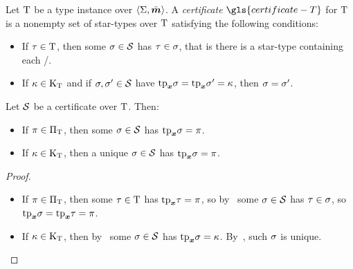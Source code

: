 \begin{definition}
Let $\mathrm{T}$ be a type instance over $\left\langle \mathrm{\Sigma},\bar{\bm{m}} \right\rangle$.
A \emph{certificate} $\gls{certificate-T}$ for $\mathrm{T}$ is a nonempty set of
star-types over $\mathrm{T}$ satisfying the following conditions:
\begin{itemize}
  \item[\condcertT]\label{cond:certT}
  If $\tau\in\mathrm{T}$, then some $\sigma\in\mathcal{S}$ has $\tau\in\sigma$,
  that is there is a star-type containing each \twotype/.
  \item[\condcertk]\label{cond:certk}
  If $\kappa\in{\mathrm{K}}_{\mathrm{T}}$ and if $\sigma,{\sigma'}\in\mathcal{S}$
  have $\mathrm{tp}_{\bm{x}}\sigma = \mathrm{tp}_{\bm{x}}{\sigma'} = \kappa$, then $\sigma = {\sigma'}$.
\end{itemize}
\end{definition}
\begin{remark}
Let $\mathcal{S}$ be a certificate over $\mathrm{T}$. Then:
\begin{itemize}
  \item[\condcertp]\label{cond:certp}
  If $\pi \in {\Pi}_{\mathrm{T}}$, then some $\sigma\in\mathcal{S}$ has $\mathrm{tp}_{\bm{x}}\sigma = \pi$.
  \item[\condcertku]\label{cond:certku}
  If $\kappa \in {\mathrm{K}}_{\mathrm{T}}$, then a unique $\sigma\in\mathcal{S}$ has $\mathrm{tp}_{\bm{x}}\sigma = \pi$.
\end{itemize}
\end{remark}
\begin{proof}
\begin{itemize}
  \item[\refcondcertp]
  If $\pi\in{\Pi}_{\mathrm{T}}$, then some $\tau\in\mathrm{T}$ has $\mathrm{tp}_{\bm{x}}\tau = \pi$,
  so by~ some $\sigma\in\mathcal{S}$ has $\tau\in\sigma$, so
  $\mathrm{tp}_{\bm{x}}\sigma = \mathrm{tp}_{\bm{x}}\tau = \pi$.
  \item[\refcondcertku]
  If $\kappa\in{\mathrm{K}}_{\mathrm{T}}$, then by~ some $\sigma\in\mathcal{S}$ has
  $\mathrm{tp}_{\bm{x}}\sigma = \kappa$.
  By~, such $\sigma$ is unique.
\end{itemize}
\end{proof}

